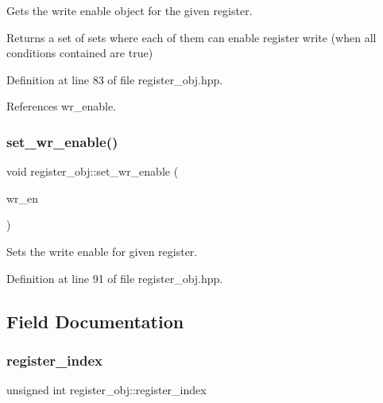 Gets the write enable object for the given register. 

\begin{DoxyReturn}{Returns}
a set of sets where each of them can enable register write (when all conditions contained are true) 
\end{DoxyReturn}


Definition at line 83 of file register\+\_\+obj.\+hpp.



References wr\+\_\+enable.

\mbox{\label{classregister__obj_a0f2f1c1a134e03fb6aec5abebb5938f3}} 
\subsubsection{\texorpdfstring{set\+\_\+wr\+\_\+enable()}{set\_wr\_enable()}}
{\footnotesize\ttfamily void register\+\_\+obj\+::set\+\_\+wr\+\_\+enable (\begin{DoxyParamCaption}\item[{const \hyperlink{generic__obj_8hpp_acb533b2ef8e0fe72e09a04d20904ca81}{generic\+\_\+obj\+Ref} \&}]{wr\+\_\+en }\end{DoxyParamCaption})\hspace{0.3cm}{\ttfamily [inline]}}



Sets the write enable for given register. 



Definition at line 91 of file register\+\_\+obj.\+hpp.



\subsection{Field Documentation}
\mbox{\label{classregister__obj_a7c94f9776055fe5b6fa418ff58417086}} 
\subsubsection{\texorpdfstring{register\+\_\+index}{register\_index}}
{\footnotesize\ttfamily unsigned int register\+\_\+obj\+::register\+\_\+index\hspace{0.3cm}{\ttfamily [private]}}



